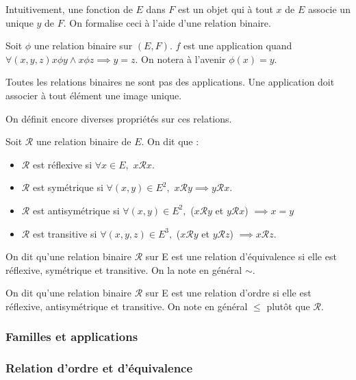Intuitivement, une fonction de $E$ dans $F$ est un objet qui à tout $x$ de $E$ associe un unique $y$ de $F$. On formalise ceci à l'aide d'une relation binaire.

\begin{defini}
	Soit $\phi$ une relation binaire sur $(E,F)$. $f$ est une application quand $\forall(x,y,z)x\phi y \land x\phi z \implies y=z$. On notera à l'avenir $\phi(x)=y$.
\end{defini}

Toutes les relations binaires ne sont pas des applications. Une application doit associer à tout élément une image unique.

On définit encore diverses propriétés sur ces relations. 

	\begin{defini}
	Soit $\mathcal{R}$ une relation binaire de $E$. On dit que :
	\begin{itemize}
		\item $\mathcal{R}$ est réflexive si $\forall x\in E,$ $x\mathcal{R}x$.
		\item $\mathcal{R}$ est symétrique si $\forall (x,y)\in E^2,$ $x\mathcal{R}y\implies y\mathcal{R}x$.
		\item $\mathcal{R}$ est antisymétrique si $\forall (x,y)\in E^2,$ ($x\mathcal{R}y$ et $y\mathcal{R}x$) $\implies x=y$
		\item $\mathcal{R}$ est transitive si $\forall (x,y,z)\in E^3,$ ($x\mathcal{R}y$ et $y\mathcal{R}z$) $\implies x\mathcal{R}z$.
	\end{itemize}
\end{defini}
	\begin{defini}
	On dit qu'une relation binaire $\mathcal{R}$ sur E est une relation d'équivalence si elle est réflexive, symétrique et transitive. On la note en général $\sim$.
    \end{defini}
	\begin{defini}
	On dit qu'une relation binaire $\mathcal{R}$ sur E est une relation d'ordre si elle est réflexive, antisymétrique et transitive. On note en général $\leq$ plutôt que $\mathcal{R}$.
    \end{defini}

\subsubsection{Familles et applications}
\subsubsection{Relation d'ordre et d'équivalence}